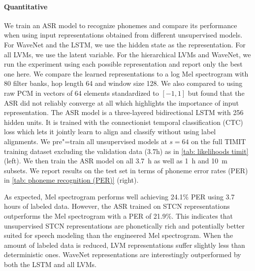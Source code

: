 {\paragraph{Quantitative}
We train an ASR model to recognize phonemes and compare its performance when using input representations obtained from different unsupervised models. 
For WaveNet and the LSTM, we use the hidden state as the representation. For all LVMs, we use the latent variable. For the hierarchical LVMs and WaveNet, we run the experiment using each possible representation and report only the best one here. 
We compare the learned representations to a log Mel spectrogram with 80 filter banks, hop length 64 and window size 128. 
We also compared to using raw PCM in vectors of 64 elements standardized to $[-1,1]$ but found that the ASR did not reliably converge at all which highlights the importance of input representation. 
The ASR model is a three-layered bidirectional LSTM with 256 hidden units. It is trained with the connectionist temporal classification (CTC) loss \parencite{graves_connectionist_2006} which lets it jointly learn to align and classify without using label alignments. 
We pre"=train all unsupervised models at $s=64$ on the full TIMIT training dataset excluding the validation data (3.7h) as in \cref{tab: likelihoods timit} (left). 
We then train the ASR model on all \SI{3.7}{h} as well as \SI{1}{h} and \SI{10}{m} subsets. We report results on the test set in terms of phoneme error rates (PER) in \cref{tab: phoneme recognition (PER)} (right).

As expected, Mel spectrogram performs well achieving 24.1\% PER using 3.7 hours of labeled data. However, the ASR trained on STCN representations outperforms the Mel spectrogram with a PER of 21.9\%. 
This indicates that unsupervised STCN representations are phonetically rich and potentially better suited for speech modeling than the engineered Mel spectrogram. 
When the amount of labeled data is reduced, LVM representations suffer slightly less than deterministic ones. WaveNet representations are interestingly outperformed by both the LSTM and all LVMs. 


}
